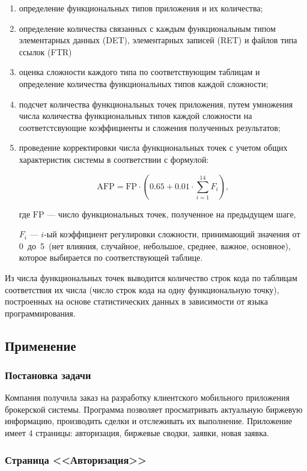 \begin{enumerate}
    \item определение функциональных типов приложения и их количества;
    \item определение количества связанных с каждым функциональным типом элементарных данных (DET), элементарных записей (RET) и файлов типа ссылок (FTR)
    \item оценка сложности каждого типа по соответствующим таблицам и определение количества функциональных типов каждой сложности;
    \item подсчет количества функциональных точек приложения, путем умножения числа количества функциональных типов каждой сложности на соответстсвующие коэффициенты и сложения полученных результатов;
    \item проведение корректировки числа функциональных точек  с учетом общих характеристик системы в соответствии с формулой:

    $$\text{AFP} = \text{FP} \cdot (0.65 + 0.01 \cdot \sum\limits_{i = 1}^{14} F_i),$$

    где $\text{FP}$ --- число функциональных точек, полученное на предыдущем шаге,

    $F_i$ --- $i$-ый коэффициент регулировки сложности, принимающий значения от 0~до~5~(нет влияния, случайное, небольшое, среднее, важное, основное), которое выбирается по соответствующей таблице.
\end{enumerate}

Из числа функциональных точек выводится количество строк кода по таблицам соответствия их числа (число строк кода на одну функциональную точку), построенных на основе статистических данных в зависимости от языка программирования.

\subsection*{Применение}

\subsubsection*{Постановка задачи}

Компания получила заказ на разработку клиентского мобильного приложения брокерской системы. Программа позволяет просматривать актуальную биржевую информацию, производить сделки и отслеживать их выполнение. Приложение имеет 4 страницы: авторизация, биржевые сводки, заявки, новая заявка.

\subsubsection*{Страница <<Авторизация>>}

